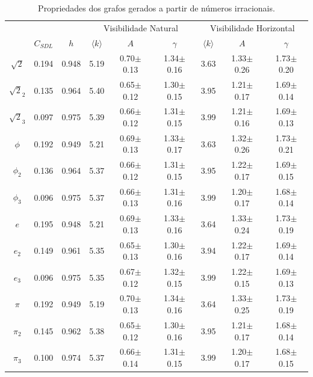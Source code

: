 \documentclass[12pt,
aspectratio=169,
]{beamer}
\begin{document}
\begin{nobarframe}

\begin{table}[H]
    \small
    \caption{ Propriedades dos grafos gerados a partir de números irracionais.}
    \begin{tabular}{|c|cc|ccc|ccc|}
    \hline
 &&& \multicolumn{3}{|c|}{Visibilidade Natural} & \multicolumn{3}{|c|}{Visibilidade Horizontal} \\
& $C_{SDL}$ & $h$ & $\langle k \rangle$ & $A$ & $\gamma$  & $\langle k \rangle$ & $A$ & $\gamma$ \\
\hline 
 $\sqrt{2}$     & 0.194 & 0.948 & 5.19 & 0.70$\pm$0.13 & 1.34$\pm$0.16 & 3.63 & 1.33$\pm$0.26 & 1.73$\pm$0.20 \\
 $\sqrt{2}_2$   & 0.135 & 0.964 & 5.40 & 0.65$\pm$0.12 & 1.30$\pm$0.15 & 3.95 & 1.21$\pm$0.17 & 1.69$\pm$0.14 \\
 $\sqrt{2}_3$   & 0.097 & 0.975 & 5.39 & 0.66$\pm$0.12 & 1.31$\pm$0.15 & 3.99 & 1.21$\pm$0.16 & 1.69$\pm$0.13 \\
 $\phi$         & 0.192 & 0.949 & 5.21 & 0.69$\pm$0.13 & 1.33$\pm$0.17 & 3.63 & 1.32$\pm$0.26 & 1.73$\pm$0.21 \\
 $\phi_2$       & 0.136 & 0.964 & 5.37 & 0.66$\pm$0.12 & 1.31$\pm$0.15 & 3.95 & 1.22$\pm$0.17 & 1.69$\pm$0.15 \\
 $\phi_3$       & 0.096 & 0.975 & 5.37 & 0.66$\pm$0.13 & 1.31$\pm$0.16 & 3.99 & 1.20$\pm$0.17 & 1.68$\pm$0.14 \\
 $e$            & 0.195 & 0.948 & 5.21 & 0.69$\pm$0.13 & 1.33$\pm$0.16 & 3.64 & 1.33$\pm$0.24 & 1.73$\pm$0.19 \\
 $e_2$          & 0.149 & 0.961 & 5.35 & 0.65$\pm$0.13 & 1.30$\pm$0.16 & 3.94 & 1.22$\pm$0.17 & 1.69$\pm$0.14 \\
 $e_3$          & 0.096 & 0.975 & 5.35 & 0.67$\pm$0.12 & 1.32$\pm$0.15 & 3.99 & 1.22$\pm$0.15 & 1.69$\pm$0.13 \\
 $\pi$          & 0.192 & 0.949 & 5.19 & 0.70$\pm$0.13 & 1.34$\pm$0.16 & 3.64 & 1.33$\pm$0.25 & 1.73$\pm$0.19 \\
 $\pi_2$        & 0.145 & 0.962 & 5.38 & 0.65$\pm$0.12 & 1.30$\pm$0.16 & 3.95 & 1.21$\pm$0.17 & 1.68$\pm$0.14 \\
 $\pi_3$        & 0.100 & 0.974 & 5.37 & 0.66$\pm$0.14 & 1.31$\pm$0.15 & 3.99 & 1.20$\pm$0.17 & 1.68$\pm$0.15 \\
 \hline
\end{tabular}
    \label{tab:numbers}
\end{table}
\end{nobarframe}
\end{document}
